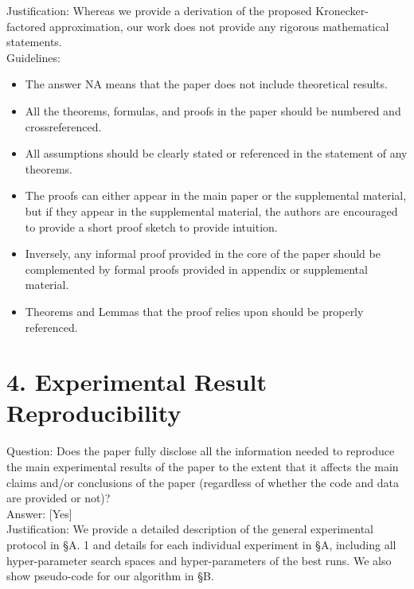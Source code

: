 \documentclass[10pt]{article}
\begin{document}
Justification: Whereas we provide a derivation of the proposed Kronecker-factored approximation, our work does not provide any rigorous mathematical statements.\\
Guidelines:

\begin{itemize}
  \item The answer NA means that the paper does not include theoretical results.
  \item All the theorems, formulas, and proofs in the paper should be numbered and crossreferenced.
  \item All assumptions should be clearly stated or referenced in the statement of any theorems.
  \item The proofs can either appear in the main paper or the supplemental material, but if they appear in the supplemental material, the authors are encouraged to provide a short proof sketch to provide intuition.
  \item Inversely, any informal proof provided in the core of the paper should be complemented by formal proofs provided in appendix or supplemental material.
  \item Theorems and Lemmas that the proof relies upon should be properly referenced.
\end{itemize}

\section*{4. Experimental Result Reproducibility}
Question: Does the paper fully disclose all the information needed to reproduce the main experimental results of the paper to the extent that it affects the main claims and/or conclusions of the paper (regardless of whether the code and data are provided or not)?\\[0pt]
Answer: [Yes]\\
Justification: We provide a detailed description of the general experimental protocol in §A. 1 and details for each individual experiment in §A, including all hyper-parameter search spaces and hyper-parameters of the best runs. We also show pseudo-code for our algorithm in §B.
\end{document}
